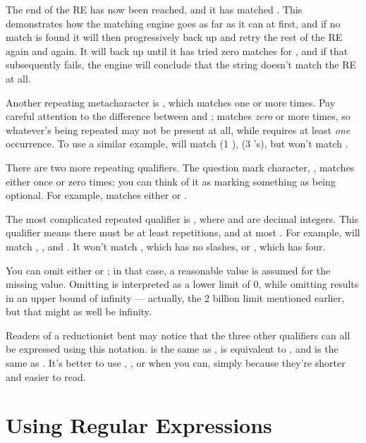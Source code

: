 \documentclass{howto}
\begin{document}
The end of the RE has now been reached, and it has matched
.  This demonstrates how the matching engine goes as far as
it can at first, and if no match is found it will then progressively
back up and retry the rest of the RE again and again.  It will back up
until it has tried zero matches for \regexp{[bcd]*}, and if that
subsequently fails, the engine will conclude that the string doesn't
match the RE at all.

Another repeating metacharacter is \regexp{+}, which matches one or
more times.  Pay careful attention to the difference between
\regexp{*} and \regexp{+}; \regexp{*} matches \emph{zero} or more
times, so whatever's being repeated may not be present at all, while
\regexp{+} requires at least \emph{one} occurrence.  To use a similar
example,  will match  (1 ),
 (3 's), but won't match .

There are two more repeating qualifiers.  The question mark character,
, matches either once or zero times; you can think of it as
marking something as being optional.  For example, 
matches either  or .  

The most complicated repeated qualifier is
, where  and  are decimal
integers.  This qualifier means there must be at least 
repetitions, and at most .  For example, 
will match , , and .  It won't match
, which has no slashes, or , which has four.

You can omit either  or ; in that case, a reasonable
value is assumed for the missing value.  Omitting  is
interpreted as a lower limit of 0, while omitting  results in  an
upper bound of infinity --- actually, the 2 billion limit mentioned
earlier, but that might as well be infinity.  

Readers of a reductionist bent may notice that the three other qualifiers
can all be expressed using this notation.   is the same
as \regexp{*},  is equivalent to \regexp{+}, and
 is the same as .  It's better to use
\regexp{*}, \regexp{+}, or  when you can, simply because
they're shorter and easier to read.

\section{Using Regular Expressions}
\end{document}
